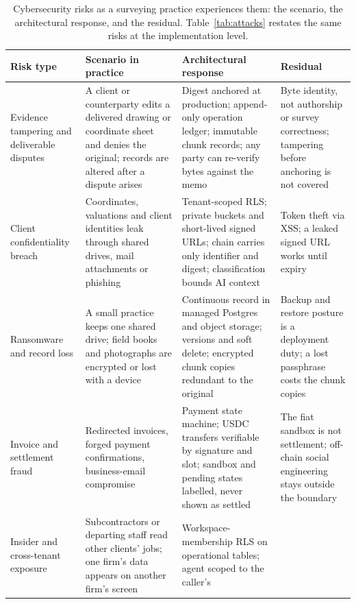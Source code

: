 \documentclass[10pt,a4paper,twocolumn]{article}
\begin{document}
\begin{table}[t]
\centering
\caption{Cybersecurity risks as a surveying practice experiences them: the scenario,
the architectural response, and the residual. Table~\ref{tab:attacks} restates the
same risks at the implementation level.}
\label{tab:risks}
\footnotesize
\setlength{\tabcolsep}{4pt}
\begin{tabular}{@{}>{\raggedright\arraybackslash}p{}
  >{\raggedright\arraybackslash}p{}
  >{\raggedright\arraybackslash}p{}
  >{\raggedright\arraybackslash}p{}@{}}
\toprule
Risk type & Scenario in practice & Architectural response & Residual \\
\midrule
Evidence tampering and deliverable disputes &
  A client or counterparty edits a delivered drawing or coordinate sheet and denies
  the original; records are altered after a dispute arises &
  Digest anchored at production; append-only operation ledger; immutable chunk
  records; any party can re-verify bytes against the memo &
  Byte identity, not authorship or survey correctness; tampering before anchoring
  is not covered \\
Client confidentiality breach &
  Coordinates, valuations and client identities leak through shared drives, mail
  attachments or phishing &
  Tenant-scoped RLS; private buckets and short-lived signed URLs; chain carries only
  identifier and digest; classification bounds AI context &
  Token theft via XSS; a leaked signed URL works until expiry \\
Ransomware and record loss &
  A small practice keeps one shared drive; field books and photographs are encrypted
  or lost with a device &
  Continuous record in managed Postgres and object storage; versions and soft delete;
  encrypted chunk copies redundant to the original &
  Backup and restore posture is a deployment duty; a lost passphrase costs the
  chunk copies \\
Invoice and settlement fraud &
  Redirected invoices, forged payment confirmations, business-email compromise &
  Payment state machine; USDC transfers verifiable by signature and slot; sandbox
  and pending states labelled, never shown as settled &
  The fiat sandbox is not settlement; off-chain social engineering stays outside
  the boundary \\
Insider and cross-tenant exposure &
  Subcontractors or departing staff read other clients' jobs; one firm's data appears
  on another firm's screen &
  Workspace-membership RLS on operational tables; agent scoped to the caller's

\end{tabular}
\end{table}
\end{document}
